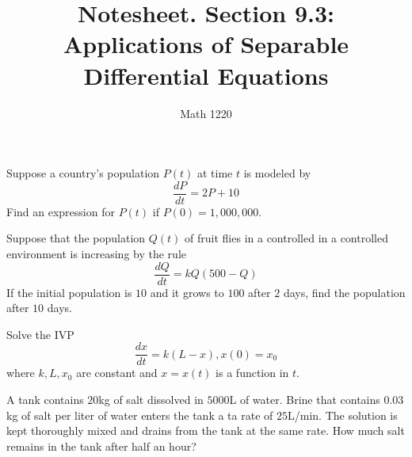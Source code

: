 \documentclass[12pt, a4paper]{article}
\author{Math 1220}
\title{Notesheet. Section 9.3: Applications of Separable Differential Equations}
\date{}
\begin{document}
\maketitle
\nameline
\begin{ex}
  Suppose a country's population \(P(t)\) at time \(t\) is modeled
  by \[
    \frac{dP}{dt} = 2P+10
  \]
  Find an expression for \(P(t)\) if \(P(0)=1,000,000\).
\end{ex}
\begin{ex}
  Suppose that the population \(Q(t)\) of fruit flies in a controlled
  in a controlled environment is increasing by the rule \[
    \frac{dQ}{dt} = kQ(500-Q)
  \]
  If the initial population is \(10\) and it grows to \(100\) after
  \(2\) days, find the population after \(10\) days.
\end{ex}
\pagebreak
\begin{ex}
  Solve the IVP \[
    \frac{dx}{dt} = k(L-x), x(0)=x_0
  \]
  where \(k,L,x_0\) are constant and \(x = x(t)\) is a function in \(t\).
\end{ex}
\begin{ex}
  A tank contains \(20\)kg of salt dissolved in \(5000\)L of
  water. Brine that contains \(0.03\)kg of salt per liter of water
  enters the tank a ta rate of \(25\)L/min. The solution is kept
  thoroughly mixed and drains from the tank at the same rate. How much
  salt remains in the tank after half an hour?
\end{ex}
\end{document}
